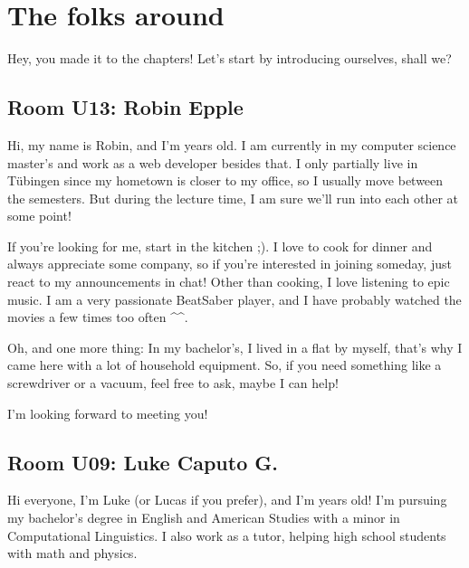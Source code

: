 \chapter{The folks around} \label{chap:introductions}
%
%
%

Hey, you made it to the chapters! Let's start by introducing ourselves, shall we?

\section{Room U13: Robin Epple} \label{sec:robinE}
%
\FPsub\result{\theCurrentDate}{\theBirthdate}
\FPdiv{}
\FPtrunc{}

Hi, my name is Robin, and I'm \myage{} years old. I am currently in my computer science master's and work as a web developer besides that. I only partially live in Tübingen since my hometown is closer to my office, so I usually move between the semesters. But during the lecture time, I am sure we'll run into each other at some point!

If you're looking for me, start in the kitchen ;). I love to cook for dinner and always appreciate some company, so if you're interested in joining someday, just react to my announcements in chat! Other than cooking, I love listening to epic music. I am a very passionate BeatSaber player, and I have probably watched the  movies a few times too often \^{}\^{}.

Oh, and one more thing: In my bachelor's, I lived in a flat by myself, that's why I came here with a lot of household equipment. So, if you need something like a screwdriver or a vacuum, feel free to ask, maybe I can help!

I'm looking forward to meeting you!

\section{Room U09: Luke Caputo G.} \label{sec:lucasC}
%
\FPsub\result{\theCurrentDate}{\theBirthdate}
\FPdiv{}
\FPtrunc{}

Hi everyone, I’m Luke (or Lucas if you prefer), and I’m \myage{} years old! I’m pursuing my bachelor’s degree in English and American Studies with a minor in Computational Linguistics. I also work as a tutor, helping high school students with math and physics.  

